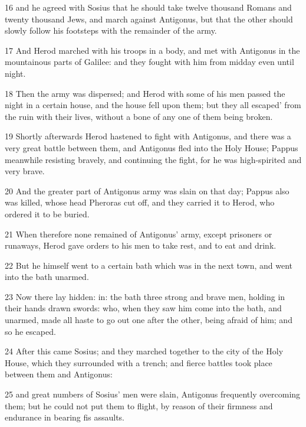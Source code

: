 \par 16 and he agreed with Sosius that he should take twelve thousand Romans and twenty thousand Jews, and march against Antigonus, but that the other should slowly follow his footsteps with the remainder of the army. 

\par 17 And Herod marched with his troops in a body, and met with Antigonus in the mountainous parts of Galilee: and they fought with him from midday even until night. 

\par 18 Then the army was dispersed; and Herod with some of his men passed the night in a certain house, and the house fell upon them; but they all escaped’ from the ruin with their lives, without a bone of any one of them being broken. 

\par 19 Shortly afterwards Herod hastened to fight with Antigonus, and there was a very great battle between them, and Antigonus fled into the Holy House; Pappus meanwhile resisting bravely, and continuing the fight, for he was high-spirited and very brave. 

\par 20 And the greater part of Antigonus army was slain on that day; Pappus also was killed, whose head Pheroras cut off, and they carried it to Herod, who ordered it to be buried. 

\par 21 When therefore none remained of Antigonus’ army, except prisoners or runaways, Herod gave orders to his men to take rest, and to eat and drink. 

\par 22 But he himself went to a certain bath which was in the next town, and went into the bath unarmed. 

\par 23 Now there lay hidden: in: the bath three strong and brave men, holding in their hands drawn swords: who, when they saw him come into the bath, and unarmed, made all haste to go out one after the other, being afraid of him; and so he escaped. 

\par 24 After this came Sosius; and they marched together to the city of the Holy House, which they surrounded with a trench; and fierce battles took place between them and Antigonus: 

\par 25 and great numbers of Sosius’ men were slain, Antigonus frequently overcoming them; but he could not put them to flight, by reason of their firmness and endurance in bearing fis assaults. 

